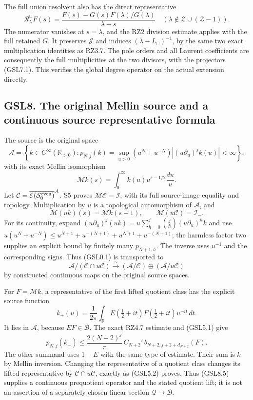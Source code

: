 The full union resolvent also has the direct representative \[
\mathscr R_\lambda^{\cup}F(s)
 =\frac{F(s)-G(s)F(\lambda)/G(\lambda)}{\lambda-s}
 \quad(\lambda\notin\mathscr Z\cup(\mathscr Z-1)).
\tag{GSL7.4}
\] The numerator vanishes at \(s=\lambda\), and the RZ2 division
estimate applies with the full retained \(G\). It preserves
\(\mathcal J\) and induces \((\lambda-L_{\cup})^{-1}\), by the same two
exact multiplication identities as RZ3.7. The pole orders and all
Laurent coefficients are consequently the full multiplicities at the two
divisors, with the projectors (GSL7.1). This verifies the global degree
operator on the actual extension directly.

\subsection{GSL8. The original Mellin source and a continuous source
representative
formula}\label{gsl8.-the-original-mellin-source-and-a-continuous-source-representative-formula}

The source is the original space \[
\mathcal A=\left\{k\in C^\infty(\mathbb R_{>0}):
p_{N,j}(k)=\sup_{u>0}(u^N+u^{-N})
 |(u\partial_u)^jk(u)|<\infty\right\},
\tag{GSL8.1}
\] with its exact Mellin isomorphism \[
\mathcal Mk(s)=\int_0^\infty k(u)u^{s-1/2}\frac{du}{u}.
\tag{GSL8.2}
\] Let
\(\mathcal C=\overline{\mathcal E(\mathcal S_0^{\rm even})}^{\mathcal A}\).
S5 proves \(\mathcal M\mathcal C=\mathcal I\), with its full
source-image equality and topology. Multiplication by \(u\) is a
topological automorphism of \(\mathcal A\), and \[
\mathcal M(uk)(s)=\mathcal Mk(s+1),\qquad
\mathcal M(u\mathcal C)=\mathcal I_-.
\tag{GSL8.3}
\] For its continuity, expand
\((u\partial_u)^j(uk)=u\sum_{h=0}^j\binom jh(u\partial_u)^hk\) and use
\(u(u^N+u^{-N})\le u^{N+1}+u^{-(N+1)}+u^{N+1}+u^{-(N+1)}\); the harmless
factor two supplies an explicit bound by finitely many \(p_{N+1,h}\).
The inverse uses \(u^{-1}\) and the corresponding signs. Thus (GSL0.1)
is transported to \[
\mathcal A/(\mathcal C\cap u\mathcal C)
 \xrightarrow{\sim}
(\mathcal A/\mathcal C)\oplus(\mathcal A/u\mathcal C)
\tag{GSL8.4}
\] by constructed continuous maps on the original source spaces.

For \(F=\mathcal Mk\), a representative of the first lifted quotient
class has the explicit source function \[
k_+(u)=\frac1{2\pi}\int_{\mathbb R}
 E(\tfrac12+it)F(\tfrac12+it)u^{-it}\,dt.
\tag{GSL8.5}
\] It lies in \(\mathcal A\), because \(EF\in\mathcal B\). The exact
RZ4.7 estimate and (GSL5.1) give \[
p_{N,j}(k_+)\le
 \frac{2(N+2)^j}{\pi}\,
 C_{N+2}'\,b_{N+2,j+2+d_{N+2}}(F).
\tag{GSL8.6}
\] The other summand uses \(1-E\) with the same type of estimate. Their
sum is \(k\) by Mellin inversion. Changing the representative of a
quotient class changes its lifted representative by
\(\mathcal C\cap u\mathcal C\), exactly as (GSL5.2) proves. Thus
(GSL8.5) supplies a continuous prequotient operator and the stated
quotient lift; it is not an assertion of a separately chosen linear
section \(\mathcal Q\to\mathcal B\).

